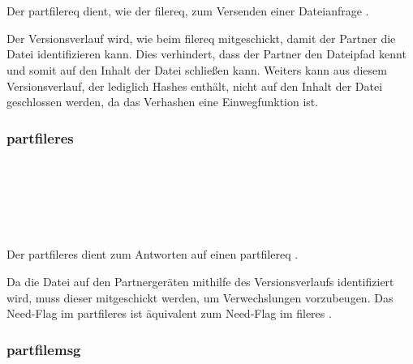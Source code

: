 	\begin{rightwordgroup}{\isprotomsgdata}
		 \\
		\skippedwords \\
	\end{rightwordgroup}
Der \gls{partfilereq} dient, wie der \gls{filereq}, zum Versenden einer Dateianfrage .
\begin{description}
	Der Versionsverlauf wird, wie beim \gls{filereq} mitgeschickt, damit der Partner die Datei identifizieren kann. Dies verhindert, dass der Partner den Dateipfad kennt und somit auf den Inhalt der Datei schließen kann. Weiters kann aus diesem Versionsverlauf, der lediglich Hashes enthält, nicht auf den Inhalt der Datei geschlossen werden, da das Verhashen eine Einwegfunktion ist. 
\end{description}

\subsubsection{\gls{partfileres}}
\messagestart
	\begin{rightwordgroup}{\isprotomsgtype}
	\end{rightwordgroup} \\
	
	\begin{rightwordgroup}{\isprotomsgdata}
		 \\
		\skippedwords \\
		\\
	\end{rightwordgroup}
Der \gls{partfileres} dient zum Antworten auf einen \gls{partfilereq} .

\begin{description}
	Da die Datei auf den Partnergeräten mithilfe des Versionsverlaufs identifiziert wird, muss dieser mitgeschickt werden, um Verwechslungen vorzubeugen.
	Das Need-Flag im \gls{partfileres} ist äquivalent zum Need-Flag im \gls{fileres} .
\end{description}

\subsubsection{\gls{partfilemsg}}
\messagestart
	\begin{rightwordgroup}{\isprotomsgtype}
	\end{rightwordgroup}\\
	
